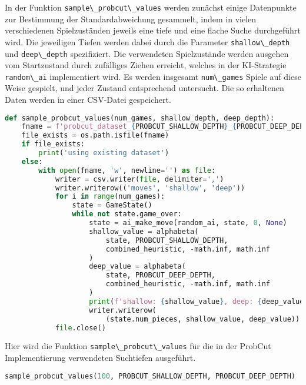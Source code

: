 In der Funktion \passthrough{\lstinline!sample\_probcut\_values!} werden
zunächst einige Datenpunkte zur Bestimmung der Standardabweichung
gesammelt, indem in vielen verschiedenen Spielzuständen jeweils eine
tiefe und eine flache Suche durchgeführt wird. Die jeweiligen Tiefen
werden dabei durch die Parameter
\passthrough{\lstinline!shallow\_depth!} und
\passthrough{\lstinline!deep\_depth!} spezifiziert. Die verwendeten
Spielzustände werden ausgehen vom Startzustand durch zufälliges Ziehen
erreicht, welches in der \ac{KI}-Strategie
\passthrough{\lstinline!random\_ai!} implementiert wird. Es werden
insgesamt \passthrough{\lstinline!num\_games!} Spiele auf diese Weise
gespielt, und jeder Zustand entsprechend untersucht. Die so erhaltenen
Daten werden in einer CSV-Datei gespeichert.

\begin{lstlisting}[language=Python]
def sample_probcut_values(num_games, shallow_depth, deep_depth):
    fname = f'probcut_dataset_{PROBCUT_SHALLOW_DEPTH}_{PROBCUT_DEEP_DEPTH}.csv'
    file_exists = os.path.isfile(fname)
    if file_exists:
        print('using existing dataset')
    else:
        with open(fname, 'w', newline='') as file:
            writer = csv.writer(file, delimiter=',')
            writer.writerow(('moves', 'shallow', 'deep'))
            for i in range(num_games):
                state = GameState()
                while not state.game_over:
                    state = ai_make_move(random_ai, state, 0, None)
                    shallow_value = alphabeta(
                        state, PROBCUT_SHALLOW_DEPTH,
                        combined_heuristic, -math.inf, math.inf
                    )
                    deep_value = alphabeta(
                        state, PROBCUT_DEEP_DEPTH,
                        combined_heuristic, -math.inf, math.inf
                    )
                    print(f'shallow: {shallow_value}, deep: {deep_value}')
                    writer.writerow(
                        (state.num_pieces, shallow_value, deep_value))
            file.close()
\end{lstlisting}

Hier wird die Funktion \passthrough{\lstinline!sample\_probcut\_values!}
für die in der ProbCut Implementierung verwendeten Suchtiefen
ausgeführt.

\begin{lstlisting}[language=Python]
sample_probcut_values(100, PROBCUT_SHALLOW_DEPTH, PROBCUT_DEEP_DEPTH)
\end{lstlisting}

